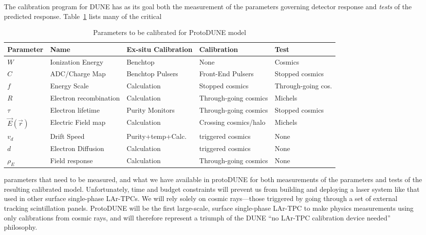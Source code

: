 	        The calibration program for DUNE has as its goal both the
measurement of the parameters governing detector response and {\it tests} of
the predicted response.  Table~\ref{tbl:params} lists many of the critical
%
\begin{table}
\begin{center}
\begin{tabular}{|l| l| l| l| l| } \hline \hline
{\bf Parameter} & {\bf Name} & {\bf Ex-situ Calibration} & {\bf Calibration} & {\bf Test} \\ \hline
$W$ & Ionization Energy  & Benchtop & None & Cosmics \\
$C$ & ADC/Charge Map & Benchtop Pulsers & Front-End Pulsers & Stopped cosmics \\
$f$ & Energy Scale & Calculation & Stopped cosmics & Through-going cos. \\
$R$ & Electron recombination & Calculation & Through-going cosmics & Michels\\
$\tau$ & Electron lifetime & Purity Monitors & Through-going cosmics & Stopped
cosmics\\
$\vec{E}(\vec{r})$ & Electric Field map & Calculation & Crossing cosmics/halo &
Michels \\
$v_d$ & Drift Speed & Purity+temp+Calc.& triggered cosmics & None \\
$d$ & Electron Diffusion & Calculation & triggered cosmics & None \\
$\rho_E$ & Field response & Calculation & Through-going cosmics & None \\ \hline \hline
\end{tabular}
\caption{Parameters to be calibrated for ProtoDUNE model\label{tbl:params}}
\end{center}
\end{table}
%
parameters that need to be measured, and what we have available in protoDUNE
for both measurements of the parameters and tests of the resulting calibrated
model.  Unfortunately, time and budget constraints will prevent us from
building and deploying a laser system like that used in other surface
single-phase LAr-TPCs.  We will rely solely on cosmic rays---those triggered by
going through a set of external tracking scintillation panels.  ProtoDUNE will
be the first large-scale, surface single-phase LAr-TPC to make physics
measurements using only calibrations from cosmic rays, and will therefore
represent a triumph of the DUNE ``no LAr-TPC calibration device needed''
philosophy.

